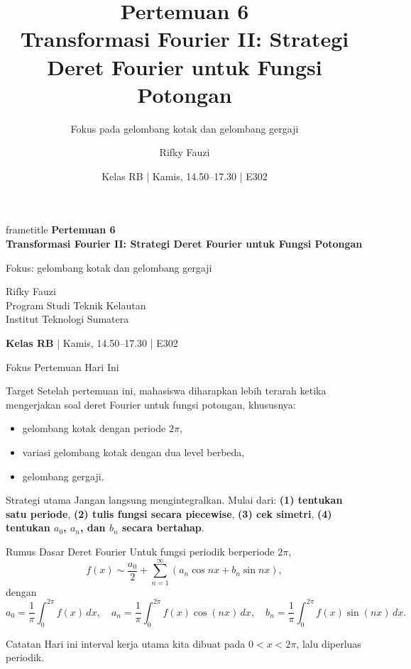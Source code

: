 \documentclass[aspectratio=169,10pt]{beamer}
\title{Pertemuan 6\\Transformasi Fourier II: Strategi Deret Fourier untuk Fungsi Potongan}
\subtitle{Fokus pada gelombang kotak dan gelombang gergaji}
\author{Rifky Fauzi}
\institute{Program Studi Teknik Kelautan\\Institut Teknologi Sumatera}
\date{Kelas RB | Kamis, 14.50--17.30 | E302}
\begin{document}
\begin{frame}[plain]
\centering
\vspace{0.4cm}
\begin{beamercolorbox}[wd=.93\textwidth,sep=10pt,rounded=true,shadow=true]{frametitle}
\centering\Large\bfseries Pertemuan 6\\[2mm]
\large Transformasi Fourier II: Strategi Deret Fourier untuk Fungsi Potongan
\end{beamercolorbox}
\vspace{0.35cm}
\large Fokus: gelombang kotak dan gelombang gergaji
\vspace{0.55cm}

\normalsize Rifky Fauzi\\[1mm]
Program Studi Teknik Kelautan\\Institut Teknologi Sumatera
\vspace{0.35cm}

\textbf{Kelas RB} \quad | \quad Kamis, 14.50--17.30 \quad | \quad E302
\end{frame}

\begin{frame}{Fokus Pertemuan Hari Ini}
\begin{block}{Target}
Setelah pertemuan ini, mahasiswa diharapkan lebih terarah ketika mengerjakan soal deret Fourier untuk fungsi potongan, khususnya:
\begin{itemize}
  \item gelombang kotak dengan periode $2\pi$,
  \item variasi gelombang kotak dengan dua level berbeda,
  \item gelombang gergaji.
\end{itemize}
\end{block}
\begin{alertblock}{Strategi utama}
Jangan langsung mengintegralkan. Mulai dari: \textbf{(1) tentukan satu periode}, \textbf{(2) tulis fungsi secara piecewise}, \textbf{(3) cek simetri}, \textbf{(4) tentukan $a_0$, $a_n$, dan $b_n$ secara bertahap}. 
\end{alertblock}
\end{frame}

\begin{frame}{Rumus Dasar Deret Fourier}
Untuk fungsi periodik berperiode $2\pi$,
\[
f(x) \sim \frac{a_0}{2}+\sum_{n=1}^{\infty}\left(a_n\cos nx+b_n\sin nx\right),
\]
dengan
\[
a_0=\frac{1}{\pi}\int_0^{2\pi}f(x)\,dx,
\quad
 a_n=\frac{1}{\pi}\int_0^{2\pi}f(x)\cos(nx)\,dx,
\quad
 b_n=\frac{1}{\pi}\int_0^{2\pi}f(x)\sin(nx)\,dx.
\]
\begin{block}{Catatan}
Hari ini interval kerja utama kita dibuat pada $0<x<2\pi$, lalu diperluas periodik.
\end{block}
\end{frame}
\end{document}
